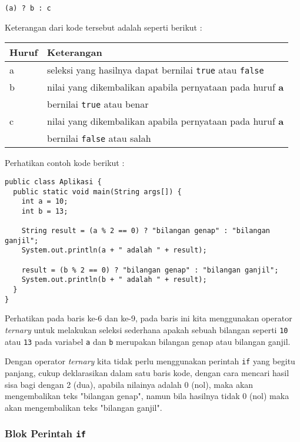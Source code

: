 \begin{lstlisting}
(a) ? b : c
\end{lstlisting}

Keterangan dari kode tersebut adalah seperti berikut :

\begin{tabular}{| l | l |}
\hline
Huruf & Keterangan \\
\hline
a & seleksi yang hasilnya dapat bernilai \texttt{true} atau \texttt{false} \\
\hline
b & nilai yang dikembalikan apabila pernyataan pada huruf \textbf{a} \\
& bernilai \texttt{true} atau benar \\
\hline
c & nilai yang dikembalikan apabila pernyataan pada huruf \textbf{a} \\
& bernilai \texttt{false} atau salah \\
\hline
\end{tabular}

Perhatikan contoh kode berikut :

\begin{lstlisting}
public class Aplikasi {
  public static void main(String args[]) {
    int a = 10;
    int b = 13;
    
    String result = (a % 2 == 0) ? "bilangan genap" : "bilangan ganjil";
    System.out.println(a + " adalah " + result);

    result = (b % 2 == 0) ? "bilangan genap" : "bilangan ganjil";
    System.out.println(b + " adalah " + result);
  }
}
\end{lstlisting}

Perhatikan pada baris ke-6 dan ke-9, pada baris ini kita menggunakan operator \textit{ternary} untuk melakukan seleksi sederhana apakah sebuah bilangan seperti \texttt{10} atau \texttt{13} pada variabel \texttt{a} dan \texttt{b} merupakan bilangan genap atau bilangan ganjil.

Dengan operator \textit{ternary} kita tidak perlu menggunakan perintah \texttt{if} yang begitu panjang, cukup deklarasikan dalam satu baris kode, dengan cara mencari hasil sisa bagi dengan 2 (dua), apabila nilainya adalah 0 (nol), maka akan mengembalikan teks "bilangan genap", namun bila hasilnya tidak 0 (nol) maka akan mengembalikan teks "bilangan ganjil".

\subsubsection{Blok Perintah \texttt{if}}

